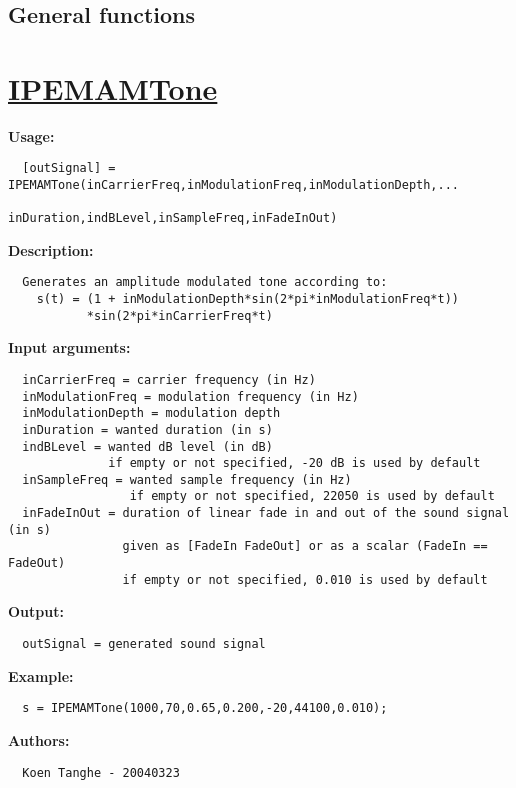 \newpage
{}
~\vfill
\begin{center}
   \section*{General functions}
   \subsection*{}
\end{center}
\vfill
{}

\newpage
\section*{\hyperlink{Concepts:IPEMAMTone}{IPEMAMTone}}
\hypertarget{FuncRef:IPEMAMTone}{}

\textbf{Usage:}
\begin{verbatim}  [outSignal] = IPEMAMTone(inCarrierFreq,inModulationFreq,inModulationDepth,...
                           inDuration,indBLevel,inSampleFreq,inFadeInOut)

\end{verbatim}
\textbf{Description:}
\begin{verbatim}  Generates an amplitude modulated tone according to:
    s(t) = (1 + inModulationDepth*sin(2*pi*inModulationFreq*t))
           *sin(2*pi*inCarrierFreq*t)

\end{verbatim}
\textbf{Input arguments:}
\begin{verbatim}  inCarrierFreq = carrier frequency (in Hz)
  inModulationFreq = modulation frequency (in Hz)
  inModulationDepth = modulation depth
  inDuration = wanted duration (in s)
  indBLevel = wanted dB level (in dB)
              if empty or not specified, -20 dB is used by default
  inSampleFreq = wanted sample frequency (in Hz)
                 if empty or not specified, 22050 is used by default
  inFadeInOut = duration of linear fade in and out of the sound signal (in s)
                given as [FadeIn FadeOut] or as a scalar (FadeIn == FadeOut)
                if empty or not specified, 0.010 is used by default

\end{verbatim}
\textbf{Output:}
\begin{verbatim}  outSignal = generated sound signal

\end{verbatim}
\textbf{Example:}
\begin{verbatim}  s = IPEMAMTone(1000,70,0.65,0.200,-20,44100,0.010);

\end{verbatim}
\textbf{Authors:}
\begin{verbatim}  Koen Tanghe - 20040323
\end{verbatim}


